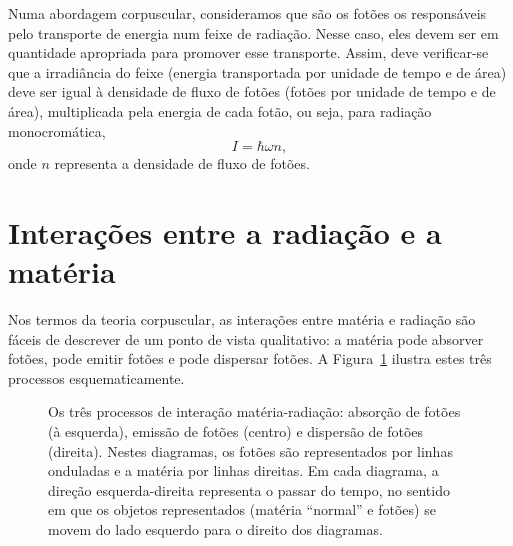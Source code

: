 Numa abordagem corpuscular, consideramos que são os fotões os responsáveis pelo
transporte de energia num feixe de radiação. Nesse caso, eles devem ser em
quantidade apropriada para promover esse transporte. Assim, deve verificar-se
que a irradiância do feixe (energia transportada por unidade de tempo e de área)
deve ser igual à densidade de fluxo de fotões (fotões por unidade de tempo e de
área), multiplicada pela energia de cada fotão, ou seja, para radiação
monocromática,
\begin{equation}
    I=\hbar\omega n,
\end{equation}
onde $n$ representa a densidade de fluxo de fotões.

\section{Interações entre a radiação e a matéria}
Nos termos da teoria corpuscular, as interações entre matéria e radiação são
fáceis de descrever de um ponto de vista qualitativo: a matéria pode absorver
fotões, pode emitir fotões e pode dispersar fotões. A Figura~\ref{fig:phot_int}
ilustra estes três processos esquematicamente.
\begin{figure}[htb]
{\centering
{}

}
\caption{Os três processos de interação matéria-radiação: absorção de fotões
(à esquerda), emissão de fotões (centro) e dispersão de fotões (direita). Nestes
diagramas, os fotões são representados por linhas onduladas e a matéria por
linhas direitas. Em cada diagrama, a direção esquerda-direita representa o
passar do tempo, no sentido em que os objetos representados (matéria ``normal''
e fotões) se movem do lado esquerdo para o direito dos
diagramas.\label{fig:phot_int}}
\end{figure}

